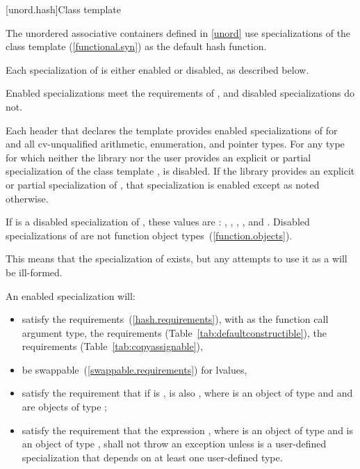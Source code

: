 [unord.hash]{Class template }

\pnum
{}%
%
The unordered associative containers defined in \ref{unord} use
specializations of the class template  (\ref{functional.syn})
as the default hash function.

\pnum
Each specialization of  is either enabled or disabled,
as described below.
\begin{note}
Enabled specializations meet the requirements of , and
disabled specializations do not.
\end{note}
Each header that declares the template 
provides enabled specializations of  for  and
all cv-unqualified arithmetic, enumeration, and pointer types.
For any type  for which neither the library nor the user provides
an explicit or partial specialization of the class template ,
 is disabled.
If the library provides an explicit or partial specialization of ,
that specialization is enabled except as noted otherwise.

\pnum
If  is a disabled specialization of ,
these values are :
,
,
,
, and
.
Disabled specializations of 
are not function object types~(\ref{function.objects}).
\begin{note}
This means that the specialization of  exists, but
any attempts to use it as a  will be ill-formed.
\end{note}

\pnum
An enabled specialization  will:
\begin{itemize}
\item satisfy the  requirements~(\ref{hash.requirements}),
with  as the function
call argument type, the  requirements (Table~\ref{tab:defaultconstructible}),
the  requirements (Table~\ref{tab:copyassignable}),
\item be swappable~(\ref{swappable.requirements}) for lvalues,
\item satisfy the requirement that if  is ,  is
also , where  is an object of type  and  and 
are objects of type ;
\item satisfy the requirement that the expression , where 
is an object of type  and  is an object of type
, shall not throw an exception unless  is a
user-defined specialization that depends on at least one user-defined type.
\end{itemize}

